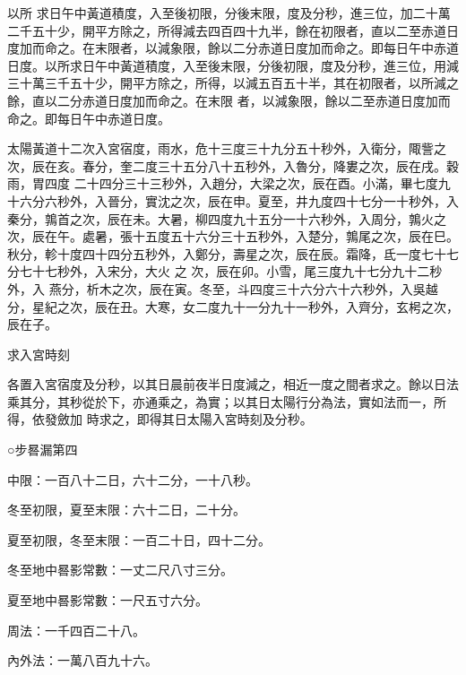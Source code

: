 \begin{pinyinscope}
 以所
 求日午中黃道積度，入至後初限，分後末限，度及分秒，進三位，加二十萬二千五十少，開平方除之，所得減去四百四十九半，餘在初限者，直以二至赤道日度加而命之。在末限者，以減象限，餘以二分赤道日度加而命之。即每日午中赤道日度。以所求日午中黃道積度，入至後末限，分後初限，度及分秒，進三位，用減三十萬三千五十少，開平方除之，所得，以減五百五十半，其在初限者，以所減之餘，直以二分赤道日度加而命之。在末限
 者，以減象限，餘以二至赤道日度加而命之。即每日午中赤道日度。



 太陽黃道十二次入宮宿度，雨水，危十三度三十九分五十秒外，入衛分，陬訾之次，辰在亥。春分，奎二度三十五分八十五秒外，入魯分，降婁之次，辰在戌。穀雨，胃四度
 二十四分三十三秒外，入趙分，大梁之次，辰在酉。小滿，畢七度九十六分六秒外，入晉分，實沈之次，辰在申。夏至，井九度四十七分一十秒外，入秦分，鶉首之次，辰在未。大暑，柳四度九十五分一十六秒外，入周分，鶉火之次，辰在午。處暑，張十五度五十六分三十五秒外，入楚分，鶉尾之次，辰在巳。秋分，軫十度四十四分五秒外，入鄭分，壽星之次，辰在辰。霜降，氐一度七十七分七十七秒外，入宋分，大火
 之
 次，辰在卯。小雪，尾三度九十七分九十二秒外，入
 燕分，析木之次，辰在寅。冬至，斗四度三十六分六十六秒外，入吳越分，星紀之次，辰在丑。大寒，女二度九十一分九十一秒外，入齊分，玄枵之次，辰在子。



 求入宮時刻



 各置入宮宿度及分秒，以其日晨前夜半日度減之，相近一度之間者求之。餘以日法乘其分，其秒從於下，亦通乘之，為實；以其日太陽行分為法，實如法而一，所得，依發斂加
 時求之，即得其日太陽入宮時刻及分秒。



 ○步晷漏第四



 中限：一百八十二日，六十二分，一十八秒。



 冬至初限，夏至末限：六十二日，二十分。



 夏至初限，冬至末限：一百二十日，四十二分。



 冬至地中晷影常數：一丈二尺八寸三分。



 夏至地中晷影常數：一尺五寸六分。



 周法：一千四百二十八。



 內外法：一萬八百九十六。




\end{pinyinscope}
